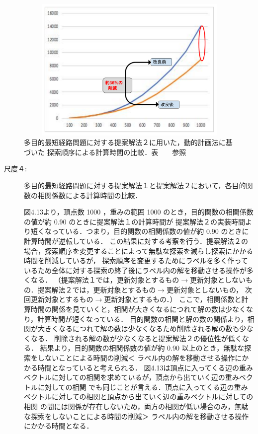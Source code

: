 \documentclass[12pt]{optlab-bachelor}
\begin{document}
\begin{figure}[htbp]
  \centering
  \includegraphics[height=7.0cm , width=15.0cm]{fig/fig15.pdf}
  \caption{多目的最短経路問題に対する提案解法２に用いた，動的計画法に基づいた
  探索順序による計算時間の比較．表　　参照}
\end{figure}


\begin{description}
  \item[尺度４:]
  多目的最短経路問題に対する提案解法１と提案解法２において，各目的関数の相関係数による計算時間の比較．

  図4.13より，頂点数 1000 ，重みの範囲 1000 のとき，目的関数の相関係数の値が約 0.90 のときに提案解法１の計算時間が
  提案解法２の実装時間より短くなっている．つまり，目的関数の相関係数の値が約 0.90 のときに計算時間が逆転している．
  この結果に対する考察を行う．提案解法２の場合，探索順序を変更することによって無駄な探索を減らし探索にかかる時間を削減しているが，
  探索順序を変更するためにラベルを多く作っているため全体に対する探索の終了後にラベル内の解を移動させる操作が多くなる．
  （提案解法１では，更新対象とするもの$\rightarrow$更新対象としないもの．提案解法２では，更新対象とするもの$\rightarrow$更新対象としないもの，
  次回更新対象とするもの$\rightarrow$更新対象とするもの．）
  ここで，相関係数と計算時間の関係を見ていくと，相関が大きくなるにつれて解の数は少なくなり，計算時間が短くなっている．
  目的関数の相関と解の数の関係より，相関が大きくなるにつれて解の数は少なくなるため削除される解の数も少なくなる．
  削除される解の数が少なくなると提案解法２の優位性が低くなる．
  結果より，目的関数の相関係数の値が約 0.90 以上のとき，無駄な探索をしないことによる時間の削減＜
  ラベル内の解を移動させる操作にかかる時間となっていると考えられる．
  図4.13は頂点に入ってくる辺の重みベクトルに対しての相関を求めているが，頂点から出ていく辺の重みベクトルに対しての相関
  でも同じことが言える．頂点に入ってくる辺の重みベクトルに対しての相関と頂点から出ていく辺の重みベクトルに対しての相関
  の間には関係が存在しないため，両方の相関が低い場合のみ，無駄な探索をしないことによる時間の削減＞
  ラベル内の解を移動させる操作にかかる時間となる．

\end{description}
\end{document}
